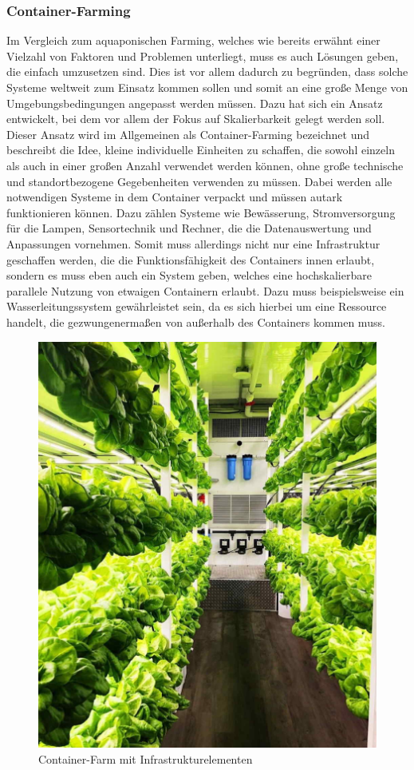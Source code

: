 \subsubsection{Container-Farming}
Im Vergleich zum aquaponischen Farming, welches wie bereits erwähnt einer Vielzahl von Faktoren und Problemen unterliegt, muss es auch Lösungen geben, die einfach umzusetzen sind. Dies ist vor allem dadurch zu begründen, dass solche Systeme weltweit zum Einsatz kommen sollen und somit an eine große Menge von Umgebungsbedingungen angepasst werden müssen. Dazu hat sich ein Ansatz entwickelt, bei dem vor allem der Fokus auf Skalierbarkeit gelegt werden soll. Dieser Ansatz wird im Allgemeinen als Container-Farming bezeichnet und beschreibt die Idee, kleine individuelle Einheiten zu schaffen, die sowohl einzeln als auch in einer großen Anzahl verwendet werden können, ohne große technische und standortbezogene Gegebenheiten verwenden zu müssen. Dabei werden alle notwendigen Systeme in dem Container verpackt und müssen autark funktionieren können. Dazu zählen Systeme wie Bewässerung, Stromversorgung für die Lampen, Sensortechnik und Rechner, die die Datenauswertung und Anpassungen vornehmen. Somit muss allerdings nicht nur eine Infrastruktur geschaffen werden, die die Funktionsfähigkeit des Containers innen erlaubt, sondern es muss eben auch ein System geben, welches eine hochskalierbare parallele Nutzung von etwaigen Containern erlaubt. Dazu muss beispielsweise ein Wasserleitungssystem gewährleistet sein, da es sich hierbei um eine Ressource handelt, die gezwungenermaßen von außerhalb des Containers kommen muss. \cite{SONG2023138353}
\begin{figure}
    \centering
    \includegraphics[width=0.7\linewidth]{thrive-container-farm-interior.jpg}
    \caption{Container-Farm mit Infrastrukturelementen}
    \label{fig:enter-label}
\end{figure}
